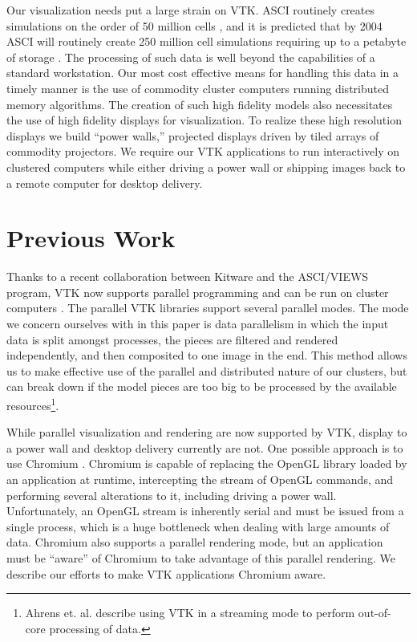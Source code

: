 \documentclass[twocolumn]{article}
\begin{document}
  Our visualization needs put a large strain on VTK.  ASCI routinely
  creates simulations on the order of 50 million cells \cite{Heermann99},
  and it is predicted that by 2004 ASCI will routinely create 250 million
  cell simulations requiring up to a petabyte of storage \cite{Smith98}.
  The processing of such data is well beyond the capabilities of a standard
  workstation.  Our most cost effective means for handling this data in a
  timely manner is the use of commodity cluster computers running
  distributed memory algorithms.  The creation of such high fidelity models
  also necessitates the use of high fidelity displays for visualization.
  To realize these high resolution displays we build ``power walls,''
  projected displays driven by tiled arrays of commodity projectors.  We
  require our VTK applications to run interactively on clustered computers
  while either driving a power wall or shipping images back to a remote
  computer for desktop delivery.


  \section{Previous Work}
  \label{sec:previous_work}

  Thanks to a recent collaboration between Kitware and the ASCI/VIEWS
  program, VTK now supports parallel programming and can be run on cluster
  computers \cite{Ahrens00}.  The parallel VTK libraries support several
  parallel modes.  The mode we concern ourselves with in this paper is data
  parallelism in which the input data is split amongst processes, the
  pieces are filtered and rendered independently, and then composited to
  one image in the end.  This method allows us to make effective use of the
  parallel and distributed nature of our clusters, but can break down if
  the model pieces are too big to be processed by the available
  resources\footnote{Ahrens et. al. \cite{Ahrens01} describe using VTK in a
  streaming mode to perform out-of-core processing of data.}.

  While parallel visualization and rendering are now supported by VTK,
  display to a power wall and desktop delivery currently are not.  One
  possible approach is to use Chromium \cite{Humphreys02}.  Chromium is
  capable of replacing the OpenGL library loaded by an application at
  runtime, intercepting the stream of OpenGL commands, and performing
  several alterations to it, including driving a power wall.
  Unfortunately, an OpenGL stream is inherently serial and must be issued
  from a single process, which is a huge bottleneck when dealing with large
  amounts of data.  Chromium also supports a parallel rendering mode, but
  an application must be ``aware'' of Chromium to take advantage of this
  parallel rendering.  We describe our efforts to make VTK applications
  Chromium aware.
\end{document}
